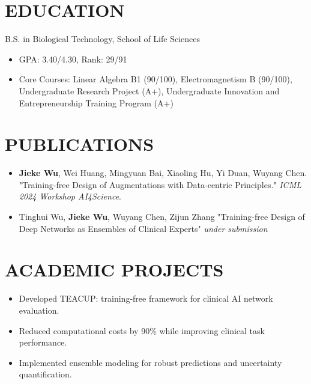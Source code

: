 \documentclass{resume}
\begin{document}



\section{EDUCATION}

B.S. in Biological Technology, School of Life Sciences
\begin{itemize}
	\item GPA: 3.40/4.30, Rank: 29/91
	\item Core Courses: Linear Algebra B1 (90/100), Electromagnetism B (90/100), Undergraduate Research Project (A+), Undergraduate Innovation and Entrepreneurship Training Program (A+)
\end{itemize}

\section{PUBLICATIONS}
\begin{itemize}
	\item \textbf{Jieke Wu}, Wei Huang, Mingyuan Bai, Xiaoling Hu, Yi Duan, Wuyang Chen. "Training-free Design of Augmentations with Data-centric Principles." \emph{ICML 2024 Workshop AI4Science}.
	\item Tinghui Wu, \textbf{Jieke Wu}, Wuyang Chen, Zijun Zhang "Training-free Design of Deep Networks as  Ensembles of Clinical Experts" \emph{under submission}
\end{itemize}

\section{ACADEMIC PROJECTS}

\begin{itemize}
	\item Developed TEACUP: training-free framework for clinical AI network evaluation.
	\item Reduced computational costs by 90\% while improving clinical task performance.
	\item Implemented ensemble modeling for robust predictions and uncertainty quantification.
\end{itemize}
\end{document}

